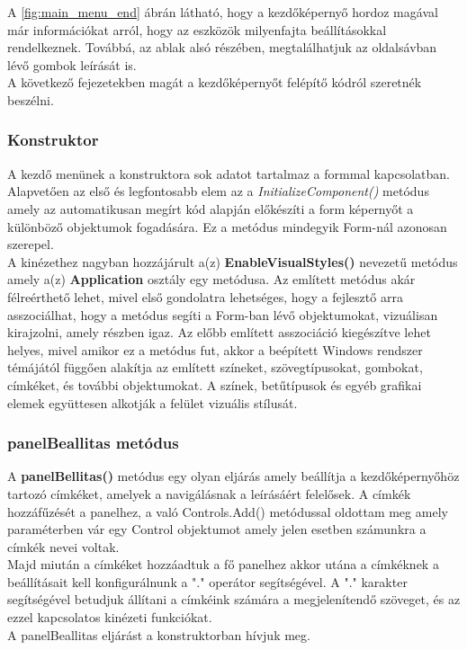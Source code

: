\documentclass[tocnopagenum]{thesis-ekf}
\theoremstyle{definition}
\theoremstyle{remark}
\begin{document}
	A \ref{fig:main_menu_end} ábrán látható, hogy a kezdőképernyő hordoz magával már információkat arról, hogy az eszközök milyenfajta beállításokkal rendelkeznek. Továbbá, az ablak alsó részében, megtalálhatjuk az oldalsávban lévő gombok leírását is.
	\\
	A következő fejezetekben magát a kezdőképernyőt felépítő kódról szeretnék beszélni.
	\subsubsection{Konstruktor}
	A kezdő menünek a konstruktora sok adatot tartalmaz a formmal kapcsolatban. Alapvetően az első és legfontosabb elem az a \textit{InitializeComponent()} metódus amely az automatikusan megírt kód alapján előkészíti a form képernyőt a különböző objektumok fogadására. Ez a metódus mindegyik Form-nál azonosan szerepel.
	\\
	 A kinézethez nagyban hozzájárult a(z) \textbf{EnableVisualStyles()} nevezetű metódus amely a(z) \textbf{Application} osztály egy metódusa. Az említett metódus akár félreérthető lehet, mivel első gondolatra lehetséges, hogy a fejlesztő arra asszociálhat, hogy a metódus segíti a Form-ban lévő objektumokat, vizuálisan kirajzolni, amely részben igaz. Az előbb említett asszociáció kiegészítve lehet helyes, mivel amikor ez a metódus fut, akkor a beépített Windows rendszer témájától függően alakítja az említett színeket, szövegtípusokat, gombokat, címkéket, és további objektumokat.
	 A színek, betűtípusok és egyéb grafikai elemek együttesen alkotják a felület vizuális stílusát. \cite{enablevisualstyless}
	\subsubsection{panelBeallitas metódus}
	A \textbf{panelBellitas()} metódus egy olyan eljárás amely beállítja a kezdőképernyőhöz tartozó címkéket, amelyek a navigálásnak a leírásáért felelősek. A címkék hozzáfűzését a panelhez, a való Controls.Add() metódussal oldottam meg amely paraméterben vár egy Control objektumot amely jelen esetben számunkra a címkék nevei voltak.
	\\
	Majd miután a címkéket hozzáadtuk a fő panelhez akkor utána a címkéknek a beállításait kell konfigurálnunk a "." operátor segítségével. A "." karakter segítségével betudjuk állítani a címkéink számára a megjelenítendő szöveget, és az ezzel kapcsolatos kinézeti funkciókat.
	\\
	A panelBeallitas eljárást a konstruktorban hívjuk meg.
\end{document}
